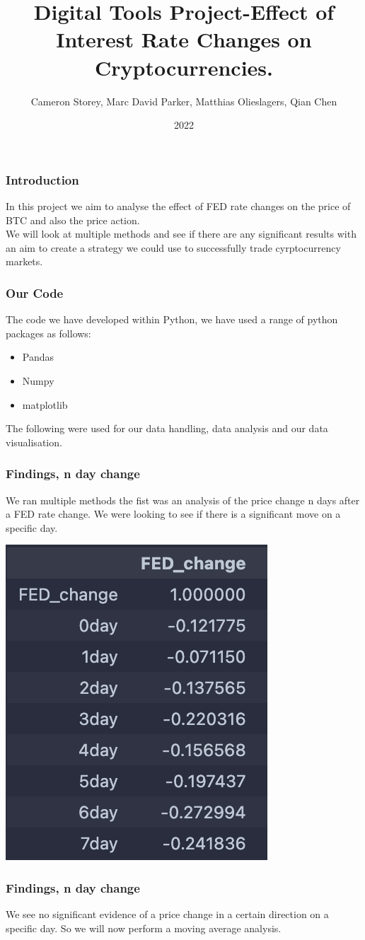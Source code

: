 \documentclass{beamer}
\title{Digital Tools Project-Effect of Interest Rate Changes on Cryptocurrencies.}
\author{Cameron Storey, Marc David Parker, Matthias Olieslagers, Qian Chen}
\institute{UZH Digital Tools for Finance}
\date{2022}
\begin{document}
\frame{\titlepage}

\begin{frame}
\frametitle{Introduction}
In this project we aim to analyse the effect of FED rate changes on the price of BTC and also the price action.\\


We will look at multiple methods and see if there are any significant results with an aim to create a strategy we could use to successfully trade cyrptocurrency markets.
\end{frame}

\begin{frame}
    \frametitle{Our Code}
    The code we have developed within Python, we have used a range of python packages as follows:
    \begin{itemize}
    \item Pandas
    \item Numpy
    \item matplotlib
\end{itemize}
The following were used for our data handling, data analysis and our data visualisation.
\end{frame}

\begin{frame}
    \frametitle{Findings, n day change}
We ran multiple methods the fist was an analysis of the price change n days after a FED rate change. We were looking to see if there is a significant move on a specific day. \\
\begin{center}
    \includegraphics{research_project/text/paper/1.png}
\end{center}


\end{frame}
\begin{frame}
    \frametitle{Findings, n day change}
We see no significant evidence of a price change in a certain direction on a specific day. So we will now perform a moving average analysis.
\end{frame}
\end{document}
